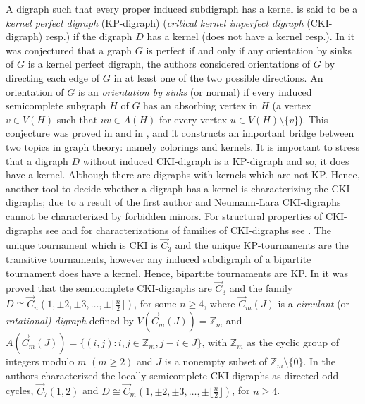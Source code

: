 A digraph such that every proper induced subdigraph has a kernel is said to be a \emph{kernel perfect digraph} (KP-digraph) (\emph{critical kernel imperfect digraph} (CKI-digraph) resp.) if the digraph $D$ has  a kernel (does not have a kernel resp.).
%
In  \cite{berge1990recent} it was conjectured that a graph $G$ is perfect if and only if any orientation by sinks of $G$ is a kernel perfect digraph, the authors considered orientations of $G$ by directing each edge of $G$ in at least one of the two possible directions. An orientation of $G$ is an \emph{orientation by sinks} (or normal) if every induced semicomplete subgraph $H$ of $G$ has an absorbing vertex in $H$ (a vertex $v\in V(H)$ such that $uv\in A(H)$ for every vertex $u\in V(H)\setminus \{v\}$).
This conjecture was proved in \cite{berge1990recent} and in \cite{boros1996perfect}, and it constructs an important bridge between two topics in graph theory: namely colorings and kernels.
%
It is important to stress that a digraph $D$ without induced CKI-digraph is a KP-digraph and so, it does have a kernel. Although there are digraphs with kernels which are not KP.  Hence, another tool to decide whether a digraph has a kernel is characterizing the CKI-digraphs; due to a result of the first author and Neumann-Lara \cite{galeana1991extending} CKI-digraphs cannot be characterized by forbidden minors. For structural properties of CKI-digraphs see \cite{balbuena2014structural, galeana2016some, galeana1991extending, galeana2016cki} and for characterizations of families of CKI-digraphs see \cite{galeana2016cki,galeana2016characterization}.
%
The unique tournament which is CKI is $\overrightarrow{C}_3$ and the unique KP-tournaments are the transitive tournaments, however any induced subdigraph of a bipartite tournament does have a kernel. Hence, bipartite tournaments are KP. In \cite{galeana1986kernel} it was proved that the semicomplete CKI-digraphs are $\overrightarrow{C}_3$ and the family $D\cong \overrightarrow{C}_n(1,\pm2,\pm3,\dots,\pm\lfloor \frac{n}{2}\rfloor)$, for some $n\ge4$, where  $\overrightarrow{C}_m(J)$ is a \emph{circulant }(or \emph{rotational) digraph} defined by $V(\overrightarrow{C}_m(J))=\mathbb{Z}_m$ and $A(\overrightarrow{C}_m(J))=\{ (i,j):i,j\in \mathbb{Z}_m,j-i\in J\} $, with  $\mathbb{Z}_m$ as the cyclic group of integers modulo $m$ $(m\geq 2)$ and $J$ is a nonempty subset of $\mathbb{Z}_m\setminus \{0\}$.
 In \cite{galeana2016characterization} the authors characterized the locally semicomplete CKI-digraphs as directed odd cycles, $\overrightarrow{C}_7(1,2)$ and $D\cong \overrightarrow{C}_{m}(1,\pm 2,\pm 3,\dots,\pm \lfloor \frac{n}{2} \rfloor )$, for $n\ge4$. 

